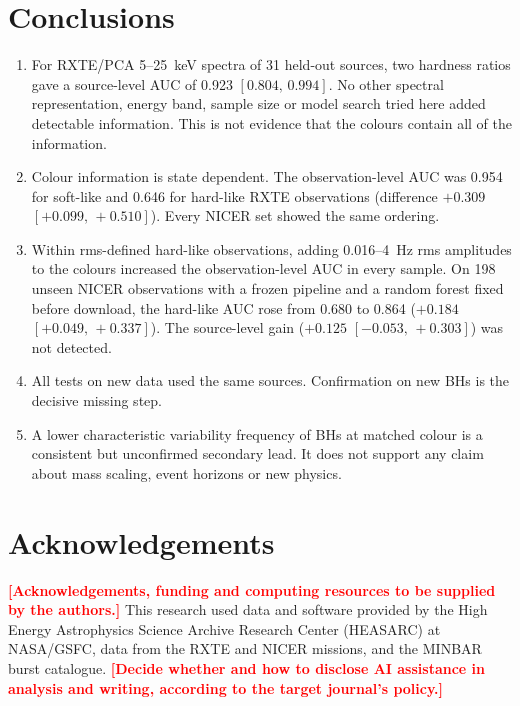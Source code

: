 \documentclass[11pt,a4paper]{article}
\newcommand{\placeholder}[1]{\textcolor{red}{\textbf{[#1]}}}
\newcommand{\ci}[2]{$[#1,\,#2]$}
\begin{document}
\section{Conclusions}\label{sec:conclusions}
\begin{enumerate}\setlength\itemsep{2pt}
\item For RXTE/PCA 5--25~keV spectra of 31 held-out sources, two hardness ratios gave a source-level AUC of 0.923
\ci{0.804}{0.994}. No other spectral representation, energy band, sample size or model search tried here added detectable
information. This is not evidence that the colours contain all of the information.
\item Colour information is state dependent. The observation-level AUC was 0.954 for soft-like and 0.646 for hard-like
RXTE observations (difference $+0.309$ \ci{+0.099}{+0.510}). Every NICER set showed the same ordering.
\item Within rms-defined hard-like observations, adding 0.016--4~Hz rms amplitudes to the colours increased the
observation-level AUC in every sample. On 198 unseen NICER observations with a frozen pipeline and a random forest fixed
before download, the hard-like AUC rose from 0.680 to 0.864 ($+0.184$ \ci{+0.049}{+0.337}). The source-level gain
($+0.125$ \ci{-0.053}{+0.303}) was not detected.
\item All tests on new data used the same sources. Confirmation on new BHs is the decisive missing step.
\item A lower characteristic variability frequency of BHs at matched colour is a consistent but unconfirmed secondary
lead. It does not support any claim about mass scaling, event horizons or new physics.
\end{enumerate}

\section*{Acknowledgements}
\placeholder{Acknowledgements, funding and computing resources to be supplied by the authors.} This research used data
and software provided by the High Energy Astrophysics Science Archive Research Center (HEASARC) at NASA/GSFC, data from
the RXTE and NICER missions, and the MINBAR burst catalogue. \placeholder{Decide whether and how to disclose AI
assistance in analysis and writing, according to the target journal's policy.}
\end{document}
